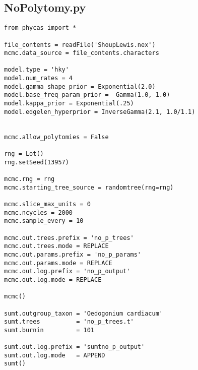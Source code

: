 \documentclass{article}
\begin{document}
\newpage
\subsection{NoPolytomy.py}\label{NoPolytomy}
\begin{verbatim}
from phycas import *

file_contents = readFile('ShoupLewis.nex')
mcmc.data_source = file_contents.characters

model.type = 'hky'   
model.num_rates = 4       
model.gamma_shape_prior = Exponential(2.0)
model.base_freq_param_prior =  Gamma(1.0, 1.0)
model.kappa_prior = Exponential(.25)
model.edgelen_hyperprior = InverseGamma(2.1, 1.0/1.1)


mcmc.allow_polytomies = False

rng = Lot()
rng.setSeed(13957)

mcmc.rng = rng
mcmc.starting_tree_source = randomtree(rng=rng)

mcmc.slice_max_units = 0
mcmc.ncycles = 2000
mcmc.sample_every = 10

mcmc.out.trees.prefix = 'no_p_trees'
mcmc.out.trees.mode = REPLACE
mcmc.out.params.prefix = 'no_p_params'
mcmc.out.params.mode = REPLACE
mcmc.out.log.prefix = 'no_p_output'
mcmc.out.log.mode = REPLACE

mcmc()

sumt.outgroup_taxon = 'Oedogonium cardiacum'
sumt.trees          = 'no_p_trees.t'
sumt.burnin         = 101

sumt.out.log.prefix = 'sumtno_p_output'
sumt.out.log.mode   = APPEND
sumt()
\end{verbatim}

\newpage

\end{document}
